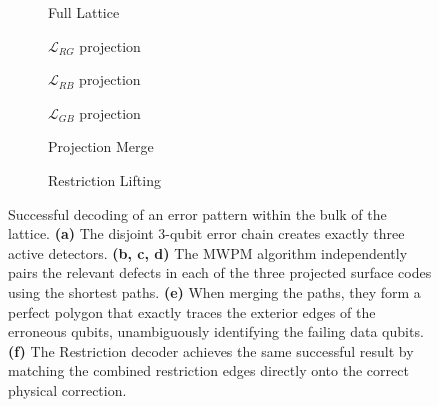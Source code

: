 \begin{figure}[!hbtp]
    \centering
    \begin{subfigure}[b]{0.29\textwidth}
        \centering
        \resizebox{\linewidth}{!}{
            
        }
        \caption{Full Lattice}
    \end{subfigure}
    \hfill
    \begin{subfigure}[b]{0.29\textwidth}
        \centering
        \resizebox{\linewidth}{!}{
            
        }
        \caption{$\mathcal{L}_{RG}$ projection}
    \end{subfigure}
    \hfill
    \begin{subfigure}[b]{0.29\textwidth}
        \centering
        \resizebox{\linewidth}{!}{
            
        }
        \caption{$\mathcal{L}_{RB}$ projection}
    \end{subfigure}
    
    \vspace{0.5cm}
    
    \begin{subfigure}[b]{0.29\textwidth}
        \centering
        \resizebox{\linewidth}{!}{
            
        }
        \caption{$\mathcal{L}_{GB}$ projection}
    \end{subfigure}
    \hfill
    \begin{subfigure}[b]{0.29\textwidth}
        \centering
        \resizebox{\linewidth}{!}{
            
        }
        \caption{Projection Merge}
    \end{subfigure}
    \hfill
    \begin{subfigure}[b]{0.29\textwidth}
        \centering
        \resizebox{\linewidth}{!}{
            
        }
        \caption{Restriction Lifting}
    \end{subfigure}

    \caption[Successful decoding of Projection and Restriction decoders in the bulk.]{Successful decoding of an error pattern within the bulk of the lattice. \textbf{(a)} The disjoint 3-qubit error chain creates exactly three active detectors. \textbf{(b, c, d)} The MWPM algorithm independently pairs the relevant defects in each of the three projected surface codes using the shortest paths. \textbf{(e)} When merging the paths, they form a perfect polygon that exactly traces the exterior edges of the erroneous qubits, unambiguously identifying the failing data qubits. \textbf{(f)} The Restriction decoder achieves the same successful result by matching the combined restriction edges directly onto the correct physical correction.}
    \label{fig:non_boundary_ok}
\end{figure}


